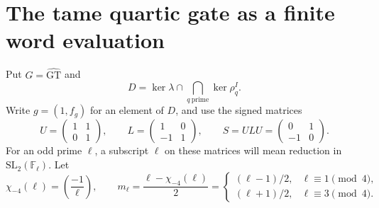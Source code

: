 \section{The tame quartic gate as a finite word evaluation}

Put $G=\widehat{\mathrm{GT}}$ and
\[
 D=\ker\lambda\cap\bigcap_{q\ \mathrm{prime}}\ker\rho_q^I.
\]
Write $g=(1,f_g)$ for an element of $D$, and use the signed
matrices
\[
 U=\begin{pmatrix}1&1\\0&1\end{pmatrix},\qquad
 L=\begin{pmatrix}1&0\\-1&1\end{pmatrix},\qquad
 S=ULU=\begin{pmatrix}0&1\\-1&0\end{pmatrix}.
\]
For an odd prime $\ell$, a subscript $\ell$ on these matrices
will mean reduction in $\mathrm{SL}_2(\mathbb F_\ell)$.
Let
\[
 \chi_{-4}(\ell)=\left(\frac{-1}{\ell}\right),\qquad
 m_\ell=\frac{\ell-\chi_{-4}(\ell)}2
 =\begin{cases}(\ell-1)/2,&\ell\equiv1\pmod4,\\
               (\ell+1)/2,&\ell\equiv3\pmod4.
   \end{cases}
\]

